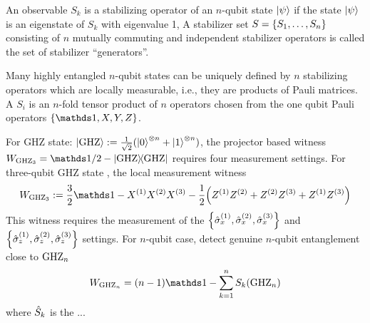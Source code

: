 \begin{definition}[stabilizer]\label{def:stabilizer}
	An observable $S_k$ is a stabilizing operator of an $n$-qubit state $\ket{\psi}$ if the state $\ket{\psi}$ is an eigenstate of $S_k$ with eigenvalue 1,
	A stabilizer set $S = \qty{ S_1, \dots , S_n}$ consisting of $n$ mutually commuting and independent stabilizer operators is called the set of stabilizer “generators”.
\end{definition}
Many highly entangled $n$-qubit states can be uniquely defined by $n$ stabilizing operators which are locally measurable, i.e., they are products of Pauli matrices.
A  $S_i$ is an $n$-fold tensor product of $n$ operators chosen from the one qubit Pauli operators $\qty{\identity,X,Y,Z}$.
\begin{example}[GHZ]\label{exm:ghz}
	For GHZ state: $\ket{\text{GHZ}}:=\frac{1}{\sqrt{2}}(\ket{0}^{\otimes n} + \ket{1}^{\otimes n} )$,
	the projector based witness 
	$\ew_{\ghz_3}=\identity/2 - \op{\ghz}$ 
	requires four measurement settings.
	For three-qubit GHZ state 
	\cite{tothDetectingGenuineMultipartite2005},
	the local measurement witness
	\begin{equation}
		\ew_{\ghz_3} := \frac{3}{2} \identity - \px^{(1)}\px^{(2)}\px^{(3)}
		- \frac{1}{2} \qty(
			\pz^{(1)} \pz^{(2)} + 
			\pz^{(2)} \pz^{(3)} + 
			\pz^{(1)} \pz^{(3)} 
		)
	\end{equation}
	This witness requires the measurement of the $\qty{\hat{\sigma}_x^{(1)},\hat{\sigma}_x^{(2)},\hat{\sigma}_x^{(3)}}$ and $\qty{\hat{\sigma}_z^{(1)},\hat{\sigma}_z^{(2)},\hat{\sigma}_z^{(3)}}$ settings.
	For $n$-qubit case, detect genuine $n$-qubit entanglement close to $\text{GHZ}_n$
	\begin{equation}
		\ew_{\ghz_n} = (n-1) \identity - \sum_{k=1}^n S_k{(\ghz_n)}
	\end{equation}
	where $\hat{S}_k$ is the  ... \cite{tothEntanglementDetectionStabilizer2005}	
\end{example}

